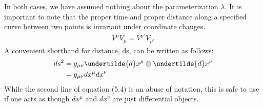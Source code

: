 \documentclass[11pt]{article}
\begin{document}
    
    In both cases, we have assumed nothing about the parameterization $\lambda$. It is important to note that the proper time and proper distance along a specified curve between two points is invariant under coordinate changes.
     \begin{equation}
            \begin{aligned}
            V^\mu V_\mu = V^{\mu'} V_{\mu'}
            \end{aligned}
        \end{equation}
    A convenient shorthand for distance, ds, can be written as follows:
        \begin{equation}
            \begin{aligned}
            ds^2 &= g_{\mu\nu} \undertilde{d}x^\mu \otimes \undertilde{d}x^\nu\\*
            &= g_{\mu\nu} dx^\mu dx^\nu
            \end{aligned}
        \end{equation}
    While the second line of equation (5.4) is an abuse of notation, this is safe to use if one acts as though $dx^\mu$ and $dx^\nu$ are just differential objects.
    
\end{document}
